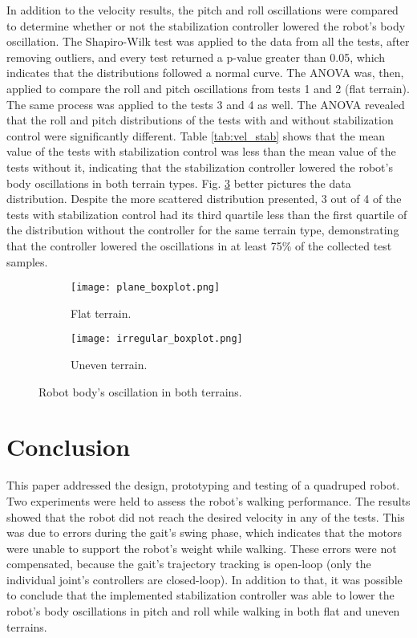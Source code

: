 \documentclass[conference]{IEEEtran}
\begin{document}
In addition to the velocity results, the pitch and roll oscillations were compared to determine whether or not the stabilization controller lowered the robot's body oscillation. The Shapiro-Wilk test was applied to the data from all the tests, after removing outliers, and every test returned a p-value greater than 0.05, which indicates that the distributions followed a normal curve. The ANOVA was, then, applied to compare the roll and pitch oscillations from tests 1 and 2 (flat terrain). The same process was applied to the tests 3 and 4 as well. The ANOVA revealed that the roll and pitch distributions of the tests with and without stabilization control were significantly different. Table \ref{tab:vel_stab} shows that the mean value of the tests with stabilization control was less than the mean value of the tests without it, indicating that the stabilization controller lowered the robot's body oscillations in both terrain types. Fig. \ref{fig:imu_test} better pictures the data distribution. Despite the more scattered distribution presented, 3 out of 4 of the tests with stabilization control had its third quartile less than the first quartile of the distribution without the controller for the same terrain type, demonstrating that the controller lowered the oscillations in at least 75\% of the collected test samples.
\vspace{0.1\baselineskip}

\begin{figure}[!tb]
  \centering
  \begin{subfigure}[t]{0.49\textwidth}
    \centering
    \texttt{[image: plane\_boxplot.png]}
    \caption{Flat terrain.}
    \label{fig:imu_test_plane}
  \end{subfigure}
  \begin{subfigure}[t]{0.49\textwidth}
    \centering
    \texttt{[image: irregular\_boxplot.png]}
    \caption{Uneven terrain.}
    \label{fig:imu_test_irregular}
  \end{subfigure}
  \caption{Robot body's oscillation in both terrains.}
  \label{fig:imu_test}
\end{figure}

\section{Conclusion} \label{conclusion}

This paper addressed the design, prototyping and testing of a quadruped robot. Two experiments were held to assess the robot's walking performance. The results showed that the robot did not reach the desired velocity in any of the tests. This was due to errors during the gait's swing phase, which indicates that the motors were unable to support the robot's weight while walking. These errors were not compensated, because the gait's trajectory tracking is open-loop (only the individual joint's controllers are closed-loop). In addition to that, it was possible to conclude that the implemented stabilization controller was able to lower the robot's body oscillations in pitch and roll while walking in both flat and uneven terrains.
\end{document}
